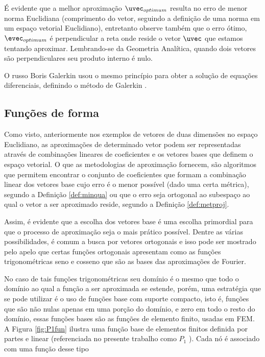   É evidente que a melhor aproximação $\uvec_{optimum}$ resulta no erro de menor norma Euclidiana (comprimento do vetor, seguindo a definição de uma norma em um espaço vetorial Euclidiano), entretanto observe também que o erro ótimo, $\evec_{optimum}$ é perpendicular a reta onde reside o vetor $\uvec$ que estamos tentando aproximar. Lembrando-se da Geometria Analítica, quando dois vetores
  são perpendiculares seu produto interno é nulo.
  
 O russo Boris Galerkin usou o mesmo  princípio para obter a solução de equações
 diferenciais, definindo o método de Galerkin \cite{reddy1993introduction}.
  
	\subsection{Funções de forma}
	Como visto, anteriormente nos exemplos de vetores de duas dimensões no espaço
  Euclidiano, as aproximações de determinado vetor podem ser representadas
  através de combinações lineares de coeficientes e os vetores bases que definem
  o espaço vetorial. O que as metodologias de aproximação fornecem, são
  algoritmos que permitem encontrar o conjunto de coeficientes que formam a
  combinação linear dos vetores base cujo erro é o menor possível (dado uma certa métrica), segundo a Definição \ref{def:minqua} ou que o erro seja ortogonal ao subespaço ao qual o vetor a ser aproximado reside, segundo a Definição \ref{def:metproj}.

  	Assim, é evidente que a escolha dos vetores base é uma escolha primordial para que o processo de aproximação seja o mais prático possível. Dentre as várias possibilidades, é comum a busca por vetores ortogonais e isso pode ser mostrado pelo apelo que certas funções ortogonais apresentam como as funções trigonométricas seno e cosseno que são as bases das aproximações de Fourier.

  	No caso de tais funções trigonométricas seu domínio é o mesmo que todo o
    domínio ao qual a função a ser aproximada se estende, porém, uma estratégia
    que se pode utilizar é o uso de funções base com suporte compacto, isto é,
    funções que são não nulas apenas em uma porção do domínio, e zero em todo o
    resto do domínio, essas funções bases são as funções de elemento finito,
    usadas em FEM. A Figura \ref{fig:P1fun} ilustra uma função base de elementos
    finitos definida por partes e linear (referenciada no presente trabalho como
    $P_1$ \cite{arnold2014periodic}). Cada nó é associado com uma função desse tipo

